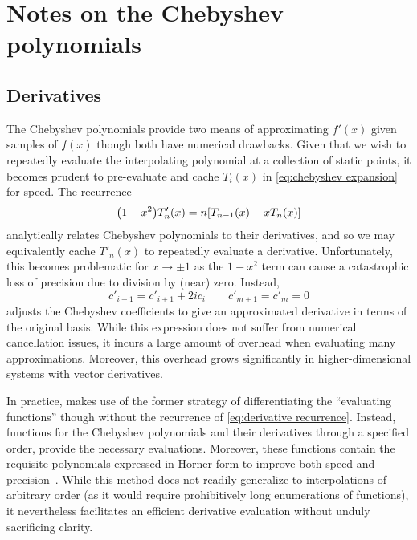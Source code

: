 \section{Notes on the Chebyshev polynomials}

\subsection{Derivatives}
The Chebyshev polynomials provide two means of approximating $f'(x)$ given samples of $f(x)$ though both have numerical drawbacks.
Given that we wish to repeatedly evaluate the interpolating polynomial at a collection of static points, it becomes prudent to pre-evaluate and cache $T_i(x)$ in \cref{eq:chebyshev expansion} for speed.
The recurrence
\begin{equation}
  \qty(1 - x^2) T_n'(x) = n \qty[T_{n-1}(x) - x T_n(x)]
  \label{eq:derivative recurrence}
\end{equation}
analytically relates Chebyshev polynomials to their derivatives, and so we may equivalently cache $T'_n(x)$ to repeatedly evaluate a derivative.
Unfortunately, this becomes problematic for $x \to \pm 1$ as the $1-x^2$ term can cause a catastrophic loss of precision due to division by (near) zero.
Instead,
\begin{equation}
  c'_{i-1} = c'_{i+1} + 2 i c_i \qquad c'_{m+1} = c'_m = 0
\end{equation}
adjusts the Chebyshev coefficients to give an approximated derivative in terms of the original basis.
While this expression does not suffer from numerical cancellation issues, it incurs a large amount of overhead when evaluating many approximations.
Moreover, this overhead grows significantly in higher-dimensional systems with vector derivatives.

In practice, \QuEST{} makes use of the former strategy of differentiating the ``evaluating functions'' though without the recurrence of \cref{eq:derivative recurrence}.
Instead, functions for the Chebyshev polynomials and their derivatives through a specified order, provide the necessary evaluations.
Moreover, these functions contain the requisite polynomials expressed in Horner form to improve both speed and precision~\cite{Knuth1997}.
While this method does not readily generalize to interpolations of arbitrary order (as it would require prohibitively long enumerations of functions), it nevertheless facilitates an efficient derivative evaluation without unduly sacrificing clarity.

